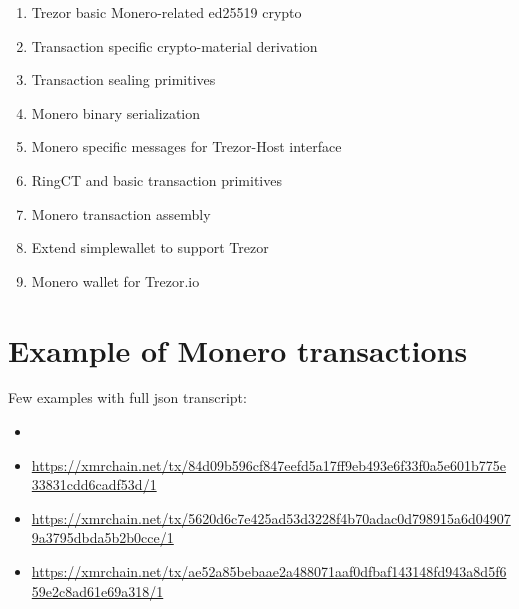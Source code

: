 \documentclass[]{article}
\begin{document}
\begin{enumerate}
	\item Trezor basic Monero-related ed25519 crypto
	\item Transaction specific crypto-material derivation
	\item Transaction sealing primitives
	\item Monero binary serialization
	\item Monero specific messages for Trezor-Host interface
	\item RingCT and basic transaction primitives
	\item Monero transaction assembly
	\item Extend simplewallet to support Trezor
	\item Monero wallet for Trezor.io 
\end{enumerate}


%



\appendix
\section{Example of Monero transactions}



Few examples with full json transcript:
\begin{itemize}
	\item \footnotesize{}
	
	\item \footnotesize\url{https://xmrchain.net/tx/84d09b596cf847eefd5a17ff9eb493e6f33f0a5e601b775e33831cdd6cadf53d/1}
	
	\item \footnotesize\url{https://xmrchain.net/tx/5620d6c7e425ad53d3228f4b70adac0d798915a6d049079a3795dbda5b2b0cce/1}
	
	\item \footnotesize\url{https://xmrchain.net/tx/ae52a85bebaae2a488071aaf0dfbaf143148fd943a8d5f659e2c8ad61e69a318/1}
\end{itemize}

{}

	
\end{document}
